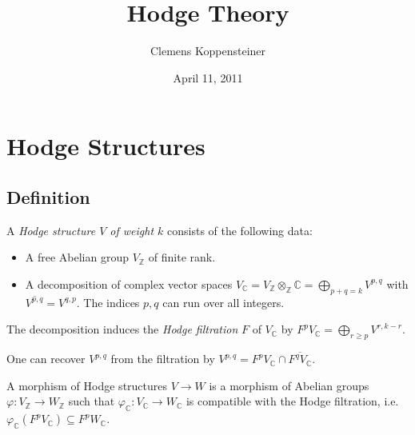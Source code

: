 \documentclass[english]{short-notes}
\title{Hodge Theory}
\author{Clemens Koppensteiner}
\date{April 11, 2011}
\begin{document}
\maketitle

\tableofcontents

\section{Hodge Structures}
    
\subsection{Definition}

\begin{Def}
    A \emph{Hodge structure $V$ of weight $k$} consists of the following data:
    \begin{itemize}
        \item A free Abelian group $V_ℤ$ of finite rank.
        \item A decomposition of complex vector spaces $V_ℂ = V_ℤ ⊗_ℤ ℂ = \bigoplus_{p+q=k} V^{p,q}$ with $\overline{V^{p,q}} = V^{q,p}$.
            The indices $p,q$ can run over all integers.
    \end{itemize}
    The decomposition induces the \emph{Hodge filtration} $F$ of $V_ℂ$ by $F^pV_ℂ = \bigoplus_{r≥p} V^{r,k-r}$.
\end{Def}

One can recover $V^{p,q}$ from the filtration by $V^{p,q} = F^pV_ℂ ∩ \overline{F^q V_ℂ}$.

\begin{Def}
    A morphism of Hodge structures $V → W$ is a morphism of Abelian groups $φ\colon V_ℤ → W_ℤ$ such that $φ_ℂ\colon V_ℂ → W_ℂ$ is compatible with the Hodge filtration, i.e.\ $φ_ℂ(F^pV_ℂ) ⊆ F^pW_ℂ$.
\end{Def}
\end{document}
